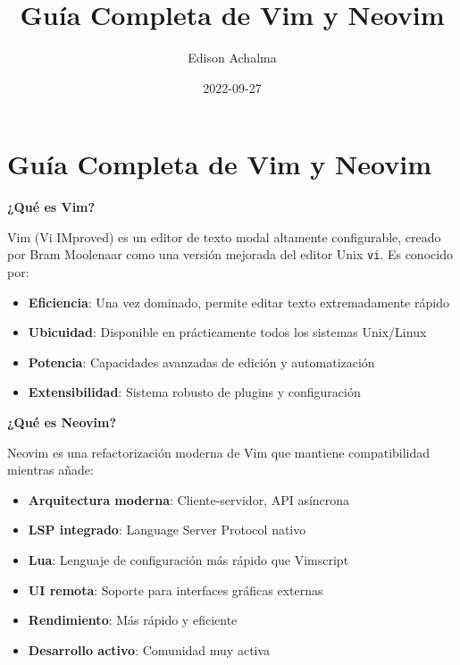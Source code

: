 \documentclass[
  doc,
  floatsintext,
  longtable,
  a4paper,
  nolmodern,
  notxfonts,
  notimes,
  12pt,
  colorlinks=true,linkcolor=blue,citecolor=blue,urlcolor=blue]{apa7}
\title{Guía Completa de Vim y Neovim}
\author{Edison Achalma}
\affiliation{
{Escuela Profesional de Economía, Universidad Nacional de San Cristóbal
de Huamanga}}
\date{2022-09-27}
\providecommand{\tightlist}{%
  \setlength{\itemsep}{0pt}\setlength{\parskip}{0pt}}
\begin{document}
\maketitle


\hypertarget{toc}{}
\tableofcontents
\newpage
\section[Introduction]{Guía Completa de Vim y Neovim}

\setcounter{secnumdepth}{3}

\setlength\LTleft{0pt}




\textbf{¿Qué es Vim?}

Vim (Vi IMproved) es un editor de texto modal altamente configurable,
creado por Bram Moolenaar como una versión mejorada del editor Unix
\texttt{vi}. Es conocido por:

\begin{itemize}
\tightlist
\item
  \textbf{Eficiencia}: Una vez dominado, permite editar texto
  extremadamente rápido
\item
  \textbf{Ubicuidad}: Disponible en prácticamente todos los sistemas
  Unix/Linux
\item
  \textbf{Potencia}: Capacidades avanzadas de edición y automatización
\item
  \textbf{Extensibilidad}: Sistema robusto de plugins y configuración
\end{itemize}

\textbf{¿Qué es Neovim?}

Neovim es una refactorización moderna de Vim que mantiene compatibilidad
mientras añade:

\begin{itemize}
\tightlist
\item
  \textbf{Arquitectura moderna}: Cliente-servidor, API asíncrona
\item
  \textbf{LSP integrado}: Language Server Protocol nativo
\item
  \textbf{Lua}: Lenguaje de configuración más rápido que Vimscript
\item
  \textbf{UI remota}: Soporte para interfaces gráficas externas
\item
  \textbf{Rendimiento}: Más rápido y eficiente
\item
  \textbf{Desarrollo activo}: Comunidad muy activa
\end{itemize}
\end{document}

